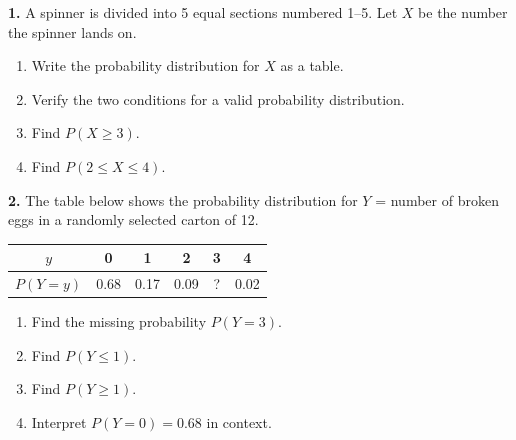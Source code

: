 \documentclass[10pt]{article}
\begin{document}
\namedateperiod

\vspace{0.1in}

\begin{practicebox}
\small

\textbf{1.} A spinner is divided into 5 equal sections numbered 1--5. Let $X$ be the number
the spinner lands on.

\begin{enumerate}[label=(\alph*), leftmargin=2em, itemsep=8pt]
  \item Write the probability distribution for $X$ as a table.

        \vspace{0.35in}

  \item Verify the two conditions for a valid probability distribution.\\
        \writeline

  \item Find $P(X \ge 3)$.  \quad \blank{4cm}

  \item Find $P(2 \le X \le 4)$. \quad \blank{4cm}
\end{enumerate}

\vspace{0.14in}

\textbf{2.} The table below shows the probability distribution for $Y$ = number of
broken eggs in a randomly selected carton of 12.

\begin{center}
\renewcommand{\arraystretch}{1.4}
\begin{tabular}{@{}cccccc@{}}
$y$ & 0 & 1 & 2 & 3 & 4 \\
\hline
$P(Y=y)$ & 0.68 & 0.17 & 0.09 & ? & 0.02 \\
\end{tabular}
\end{center}

\begin{enumerate}[label=(\alph*), leftmargin=2em, itemsep=8pt]
  \item Find the missing probability $P(Y=3)$.  \quad \blank{4cm}
  \item Find $P(Y \le 1)$.  \quad \blank{4cm}
  \item Find $P(Y \ge 1)$.  \quad \blank{4cm}
  \item Interpret $P(Y = 0) = 0.68$ in context.\\
        \writeline\\[1pt]\writeline
\end{enumerate}


\end{practicebox}
\end{document}
